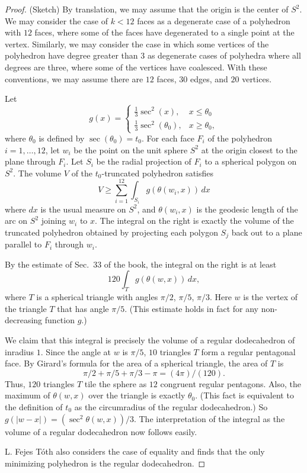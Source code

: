 \begin{proof} (Sketch)  By translation, we may assume that
the origin is the center of $S^2$.
We may consider the case of $k<12$ faces as a degenerate
case of a polyhedron with $12$ faces, where some of the faces
have degenerated to a single point at the vertex.  Similarly,
we may consider the case in which some vertices of the polyhedron
have degree greater than $3$ as degenerate cases of polyhedra 
where all degrees are three, where some of the vertices have
coalesced.   With these conventions, 
we may assume there are $12$ faces, $30$ edges,
and $20$ vertices.

Let 
  $$g(x) = \begin{cases}
          \frac13 \sec^2 (x), & x \le \theta_0\\
          \frac13 \sec^2 (\theta_0), & x \ge \theta_0,
          \end{cases}
   $$
where $\theta_0$ is defined by $\sec(\theta_0) = t_0$.
For each face $F_i$ of the polyhedron $i=1,\ldots, 12$, 
let $w_i$ be the point 
on the unit sphere $S^2$ at the origin closest to the plane through $F_i$.
Let $S_i$ be the radial projection of $F_i$ to a spherical polygon
on $S^2$.   The volume $V$ of the $t_0$-truncated polyhedron satisfies
    $$
    V \ge \sum_{i=1}^{12} \int_{S_i} g(\theta(w_i,x))\,dx
    $$
where $dx$ is the usual measure on $S^2$,
and $\theta(w_i,x)$ is the geodesic length of the arc on $S^2$ joining
$w_i$ to $x$. The integral on the
right is exactly the volume of the truncated polyhedron obtained
by projecting each polygon $S_j$ back out to a plane parallel to $F_i$
through $w_i$.

By the estimate of Sec.~33 of the book, 
the integral on the right is at least
   $$
   120 \int_{T} g(\theta(w,x))\, dx,
   $$
where $T$ is a spherical triangle with angles $\pi/2$,
$\pi/5$, $\pi/3$.  Here $w$ is the vertex of the triangle $T$
that has angle $\pi/5$.  (This estimate 
holds in fact for any non-decreasing function $g$.)

We claim that this integral is precisely the volume of a regular
dodecahedron of inradius $1$.  Since the angle at $w$ is $\pi/5$,
$10$ triangles $T$ form a regular pentagonal face.  By Girard's
formula for the area of a spherical triangle, the area of $T$ is
   $$
   \pi/2 + \pi/5 + \pi/3 - \pi = (4\pi)/(120).
   $$
Thus, $120$ triangles $T$ tile the sphere as $12$ congruent
regular pentagons.
Also, the maximum of $\theta(w,x)$ over the triangle is exactly $\theta_0$.  (This fact is equivalent to the definition of $t_0$ as the circumradius of the regular
dodecahedron.)
So $g(|w-x|) = (\sec^2\theta(w,x))/3$. The interpretation of the integral
as the volume of a regular dodecahedron now follows easily.

L. Fejes T\'oth also considers the case of equality and finds that
the only minimizing polyhedron is the regular dodecahedron.
\end{proof}







